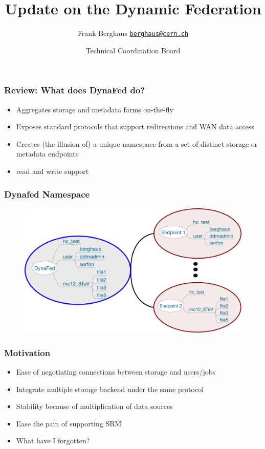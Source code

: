 \documentclass{beamer}
\title{Update on the Dynamic Federation}
\date[ISPN ’80]{Technical Coordination Board}
\author[Euclid]{Frank Berghaus \href{mailto:berghaus@cern.ch}{\texttt{berghaus@cern.ch}}}
\begin{document}
\begin{frame}
\titlepage
\end{frame}


\begin{frame}
\frametitle{Review: What does DynaFed do?}
\begin{itemize}
\item Aggregates storage and metadata farms on-the-fly
\item Exposes standard protocols that support redirections and WAN data access
\item Creates (the illusion of) a unique namespace from a set of distinct storage or metadata endpoints
\item read and write support
\end{itemize}
\end{frame}

\begin{frame}
  \frametitle{Dynafed Namespace}
  \begin{figure}
      \centering
      \includegraphics[width=\columnwidth]{dynafed-namespaces.png}
  \end{figure}
\end{frame}

\begin{frame}
  \frametitle{Motivation}
  \begin{itemize}
    \item Ease of negotiating connections between storage and users/jobs
    \item Integrate multiple storage backend under the same protocol
    \item Stability because of multiplication of data sources
    \item Ease the pain of supporting SRM
    \item What have I forgotten?
  \end{itemize}
\end{frame}
\end{document}
